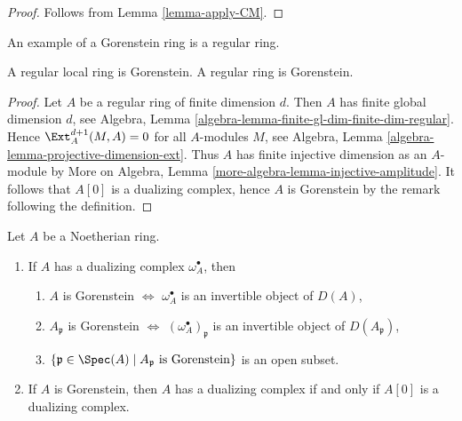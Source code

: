\begin{proof}
Follows from Lemma \ref{lemma-apply-CM}.
\end{proof}

\noindent
An example of a Gorenstein ring is a regular ring.

\begin{lemma}
\label{lemma-regular-gorenstein}
A regular local ring is Gorenstein.
A regular ring is Gorenstein.
\end{lemma}

\begin{proof}
Let $A$ be a regular ring of finite dimension $d$. Then $A$ has finite
global dimension $d$, see
Algebra, Lemma \ref{algebra-lemma-finite-gl-dim-finite-dim-regular}.
Hence $\Ext^{d + 1}_A(M, A) = 0$ for all $A$-modules $M$, see
Algebra, Lemma \ref{algebra-lemma-projective-dimension-ext}.
Thus $A$ has finite injective dimension as an $A$-module by
More on Algebra, Lemma \ref{more-algebra-lemma-injective-amplitude}.
It follows that $A[0]$ is a dualizing complex, hence $A$ is
Gorenstein by the remark following the definition.
\end{proof}

\begin{lemma}
\label{lemma-gorenstein}
Let $A$ be a Noetherian ring.
\begin{enumerate}
\item If $A$ has a dualizing complex $\omega_A^\bullet$, then
\begin{enumerate}
\item $A$ is Gorenstein $\Leftrightarrow$ $\omega_A^\bullet$ is an invertible
object of $D(A)$,
\item $A_\mathfrak p$ is Gorenstein $\Leftrightarrow$
$(\omega_A^\bullet)_\mathfrak p$ is an invertible object of
$D(A_\mathfrak p)$,
\item $\{\mathfrak p \in \Spec(A) \mid A_\mathfrak p\text{ is Gorenstein}\}$
is an open subset.
\end{enumerate}
\item If $A$ is Gorenstein, then $A$ has a dualizing complex if and
only if $A[0]$ is a dualizing complex.
\end{enumerate}
\end{lemma}

